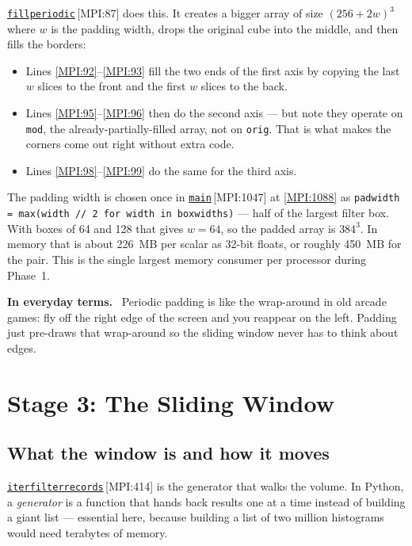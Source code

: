 \documentclass[11pt,a4paper]{report}
\newcommand{\srcbase}{vscode://file/Users/syellapa/Documents/Research/2026/ANSYS/Multi-ScalarPDF}
\newcommand{\srctag}[1]{{\footnotesize\textcolor{TagGray}{[#1]}}}
\newcommand{\Mpi}[2]{\href{\srcbase/EnsightPDFHybridDatasetMPI.py:#1}{\texttt{#2}}\,\srctag{MPI:#1}}
\newcommand{\MpiL}[1]{\href{\srcbase/EnsightPDFHybridDatasetMPI.py:#1}{\srctag{MPI:#1}}}
\newcommand{\code}[1]{\texttt{#1}}
\renewcommand{\_}{\origtextunderscore\allowbreak}
\newlength{\calloutwidth}
\newcommand{\calloutOpen}{%
  \par\medskip\noindent
  \setlength{\calloutwidth}{\dimexpr\linewidth-2\fboxsep\relax}%
  \begin{lrbox}{\calloutbox}\begin{minipage}{\calloutwidth}}
\newcommand{\calloutClose}[1]{%
  \end{minipage}\end{lrbox}\colorbox{#1}{\usebox{\calloutbox}}\par\medskip}
\newenvironment{analogy}
  {\calloutOpen\textbf{In everyday terms.}\ }
  {\calloutClose{BoxBG}}
\begin{document}
\Mpi{87}{fill\_periodic} does this. It creates a bigger array of size
$(256 + 2w)^3$ where $w$ is the padding width, drops the original cube into the middle, and
then fills the borders:

\begin{itemize}
  \item Lines \MpiL{92}--\MpiL{93} fill the two ends of the first axis by copying the last
        $w$ slices to the front and the first $w$ slices to the back.
  \item Lines \MpiL{95}--\MpiL{96} then do the second axis --- but note they operate on
        \code{mod}, the already-partially-filled array, not on \code{orig}. That is what makes
        the corners come out right without extra code.
  \item Lines \MpiL{98}--\MpiL{99} do the same for the third axis.
\end{itemize}

The padding width is chosen once in \Mpi{1047}{main} at \MpiL{1088} as
\code{pad\_width = max(width // 2 for width in box\_widths)} --- half of the largest filter box.
With boxes of 64 and 128 that gives $w = 64$, so the padded array is $384^3$. In memory that
is about 226~MB per scalar as 32-bit floats, or roughly 450~MB for the pair. This is the
single largest memory consumer per processor during Phase~1.

\begin{analogy}
Periodic padding is like the wrap-around in old arcade games: fly off the right edge of the
screen and you reappear on the left. Padding just pre-draws that wrap-around so the sliding
window never has to think about edges.
\end{analogy}

\chapter{Stage 3: The Sliding Window}

\section{What the window is and how it moves}

\Mpi{414}{iter\_filter\_records} is the generator that walks the volume. In Python, a
\emph{generator} is a function that hands back results one at a time instead of building a
giant list --- essential here, because building a list of two million histograms would need
terabytes of memory.
\end{document}
